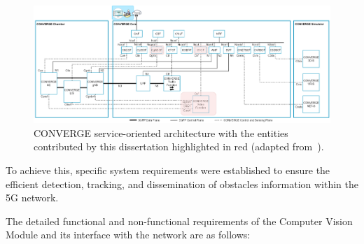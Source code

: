 \begin{figure}[H]
    \centering
    \includegraphics[width=0.9\linewidth]{figures/converge_my_work.drawio}
    \caption[CONVERGE service-oriented architecture with the entities contributed by this dissertation highlighted in red]{CONVERGE service-oriented architecture with the entities contributed by this dissertation highlighted in red (adapted from~\cite{converge2023_specs}).}
    \label{fig:my_chamber}
\end{figure}

To achieve this, specific system requirements were established to ensure the efficient detection, tracking, and dissemination of obstacles information within the 5G network.

The detailed functional and non-functional requirements of the Computer Vision Module and its interface with the network are as follows:

